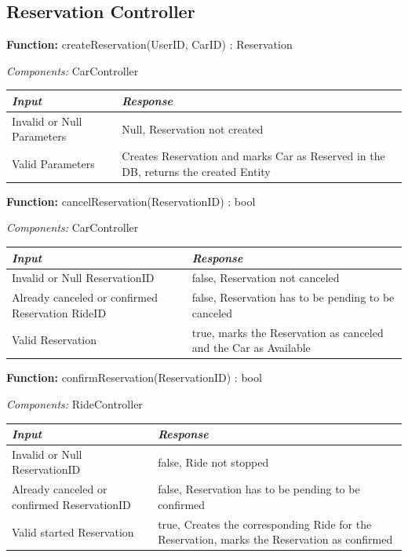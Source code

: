 \documentclass[a4paper]{article}
\begin{document}
\subsection{Reservation Controller}
\textbf{Function:} createReservation(UserID, CarID) : Reservation \par
\textit{Components:} CarController
\begin{center}
\begin{tabular}{ | L{6cm} | L{6cm} | }
\hline
	\textit{Input}& \textit{Response}\\ \hline
	Invalid or Null Parameters & Null, Reservation not created \\ \hline
	Valid Parameters & Creates Reservation and marks Car as Reserved in the DB, returns the created Entity\\ \hline
\end{tabular}
\end{center}
\textbf{Function:} cancelReservation(ReservationID) : bool \par
\textit{Components:} CarController
\begin{center}
\begin{tabular}{ | L{6cm} | L{6cm} | }
\hline
	\textit{Input}& \textit{Response}\\ \hline
	Invalid or Null ReservationID & false, Reservation not canceled \\ \hline
	Already canceled or confirmed Reservation RideID & false, Reservation has to be pending to be canceled \\ \hline
	Valid Reservation & true, marks the Reservation as canceled and the Car as Available\\ \hline
\end{tabular}
\end{center}
\textbf{Function:} confirmReservation(ReservationID) : bool \par
\textit{Components:} RideController
\begin{center}
\begin{tabular}{ | L{6cm} | L{6cm} | }
\hline
	\textit{Input}& \textit{Response}\\ \hline
	Invalid or Null ReservationID & false, Ride not stopped \\ \hline
	Already canceled or confirmed ReservationID & false, Reservation has to be pending to be confirmed\\ \hline
	Valid started Reservation & true, Creates the corresponding Ride for the Reservation, marks the Reservation as confirmed\\ \hline
\end{tabular}
\end{center}
\end{document}
